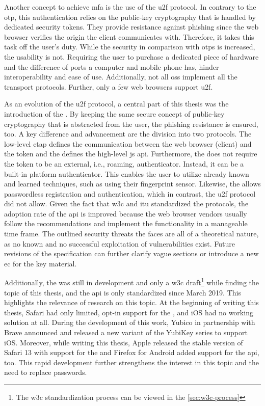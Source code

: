 Another concept to achieve \gls{mfa} is the use of the \gls{u2f} protocol. In contrary to the \gls{otp}, this authentication relies on the public-key cryptography that is handled by dedicated security tokens. They provide resistance against phishing since the web browser verifies the origin the client communicates with. Therefore, it takes this task off the user's duty. While the security in comparison with \glspl{otp} is increased, the usability is not. Requiring the user to purchase a dedicated piece of hardware and the difference of ports a computer and mobile phone has, hinder interoperability and ease of use. Additionally, not all \glspl{os} implement all the transport protocols. Further, only a few web browsers support \gls{u2f}.

As an evolution of the \gls{u2f} protocol, a central part of this thesis was the introduction of the \wa. By keeping the same secure concept of public-key cryptography that is abstracted from the user, the phishing resistance is ensured, too. A key difference and advancement are the division into two protocols. The low-level \gls{ctap} defines the communication between the web browser (client) and the token and the \wa{} defines the high-level \gls{js} \gls{api}. Furthermore, the \wa{} does not require the token to be an external, i.e., roaming, authenticator. Instead, it can be a built-in platform authenticator. This enables the user to utilize already known and learned techniques, such as using their fingerprint sensor. Likewise, the \wa{} allows passwordless registration and authentication, which in contrast, the \gls{u2f} protocol did not allow. Given the fact that \gls{w3c} and \gls{itu} standardized the protocols, the adoption rate of the \gls{api} is improved because the web browser vendors usually follow the recommendations and implement the functionality in a manageable time frame. The outlined security threats the \wa{} faces are all of a theoretical nature, as no known and no successful exploitation of vulnerabilities exist. Future revisions of the specification can further clarify vague sections or introduce a new \gls{ec} for the key material.

\newpage

Additionally, the \wa{} was still in development and only a \gls{w3c} draft\footnote{The \gls{w3c} standardization process can be viewed in the \autoref{sec:w3c-process}} while finding the topic of this thesis, and the \gls{api} is only standardized since March 2019. This highlights the relevance of research on this topic. At the beginning of writing this thesis, Safari had only limited, opt-in support for the \wa, and iOS had no working solution at all. During the development of this work, Yubico in partnership with Brave announced and released a new variant of the YubiKey series to support iOS. Moreover, while writing this thesis, Apple released the stable version of Safari 13 with support for the \wa{} and Firefox for Android added support for the \gls{api}, too. This rapid development further strengthens the interest in this topic and the need to replace passwords. 

